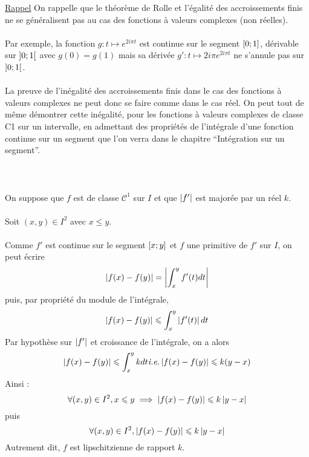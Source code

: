 \begin{dem}
    \underline{Rappel} On rappelle que le théorème de Rolle et l’égalité des accroissements finis ne se généralisent pas au cas des
    fonctions à valeurs complexes (non réelles).\\~\\
    Par exemple, la fonction \(g : t \mapsto e^{2i\pi t}\) est continue sur le segment \(\left[0;1\right]\), dérivable sur \(\left]0;1\right[\) avec \(g(0) = g(1)\) mais sa dérivée \(g' : t \mapsto 2i\pi e^{2i\pi t}\) ne s’annule pas sur \(\left]0;1\right[\).\\~\\
    La preuve de l’inégalité des accroissements finis dans le cas des fonctions à valeurs complexes ne peut donc se faire comme dans le cas réel. On peut tout de même démontrer cette inégalité, pour les fonctions à valeurs complexes de classe C1 sur un intervalle, en admettant des propriétés de l’intégrale d’une fonction continue sur un segment que l’on verra dans le chapitre “Intégration sur un segment”.\\~\\~\\~\\
    On suppose que \(f\) est de classe  \(\mathcal{C}^1\) sur \(I\) et que \(\left\lvert f '\right\rvert\) est majorée par un réel \(k\).\\~\\
    Soit \((x, y) \in I^2\) avec \(x \leq y\).\\~\\
    Comme \(f '\) est continue sur le segment \(\left[x;y\right]\) et \(f\) une primitive de \(f '\) sur \(I\), on peut écrire
    \[\left\lvert f(x) - f(y)\right\rvert = \left\lvert\int_x^y f'(t)dt\right\rvert\]
    puis, par propriété du module de l’intégrale,
    \[\left\lvert f (x) - f (y)\right\rvert \leqslant \int^y_x \left\lvert f '(t)\right\rvert dt\]
    Par hypothèse sur \(\left\lvert f '\right\rvert\) et croissance de l’intégrale, on a alors
    \[\left\lvert f (x) - f (y)\right\rvert \leqslant \int^y_x k dt  \textit{i.e.}  \left\lvert f (x) - f (y)\right\rvert \leqslant k (y - x)\] 
    Ainsi :
    \[\forall (x, y) \in I^2, x \leqslant y \implies \left\lvert f (x) - f (y)\right\rvert \leqslant k \left\lvert y - x\right\rvert\]
    puis
    \[\forall (x, y) \in I^2, \left\lvert f (x) - f (y)\right\rvert \leqslant k \left\lvert y - x\right\rvert\] 
    Autrement dit, \(f\) est lipschitzienne de rapport \(k\).
\end{dem}
